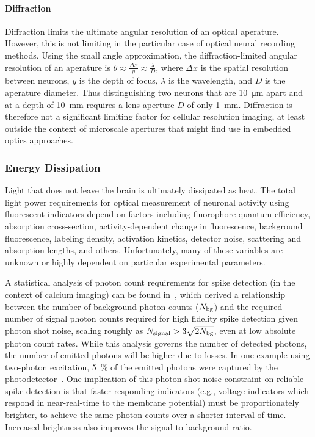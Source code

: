 \paragraph{Diffraction}
Diffraction limits the ultimate angular resolution of an optical aperature. However, this is not limiting in the particular case of optical neural recording methods. Using the small angle approximation, the diffraction-limited angular resolution of an aperature is $\theta \approx \frac{\Delta x}{y} \approx \frac{\lambda}{D}$, where $\Delta x$ is the spatial resolution between neurons, $y$ is the depth of focus, $\lambda$ is the wavelength, and $D$ is the aperature diameter. Thus distinguishing two neurons that are \SI{10}{\micro\meter} apart and at a depth of \SI{10}{\milli\meter} requires a lens aperture $D$ of only \SI{1}{\milli\meter}. Diffraction is therefore not a significant limiting factor for cellular resolution imaging, at least outside the context of microscale apertures that might find use in embedded optics approaches.

\subsubsection{Energy Dissipation}

Light that does not leave the brain is ultimately dissipated as heat.
The total light power requirements for optical measurement of neuronal activity using fluorescent indicators depend on factors including
fluorophore quantum efficiency,
absorption cross-section,
activity-dependent change in fluorescence,
background fluorescence,
labeling density,
activation kinetics,
detector noise,
scattering and absorption lengths,
and others. Unfortunately, many of these variables are unknown or highly dependent on particular experimental parameters.

A statistical analysis of photon count requirements for spike detection (in the context of calcium imaging) can be found in~\cite{wilt13}, which derived a relationship between the number of background photon counts ($N_{\text{\scriptsize bg}}$) and the required number of signal photon counts required for high fidelity spike detection given photon shot noise, scaling roughly as $N_{\text{\scriptsize signal}} > 3\sqrt{2N_{\text{\scriptsize bg}}}$, even at low absolute photon count rates.
While this analysis governs the number of detected photons, the number of emitted photons will be higher due to losses.
In one example using two-photon excitation, \SI{5}{\percent} of the emitted photons were captured by the photodetector~\cite{kim99}. One implication of this photon shot noise constraint on reliable spike detection is that faster-responding indicators (e.g., voltage indicators which respond in near-real-time to the membrane potential) must be proportionately brighter, to achieve the same photon counts over a shorter interval of time. Increased brightness also improves the signal to background ratio.

